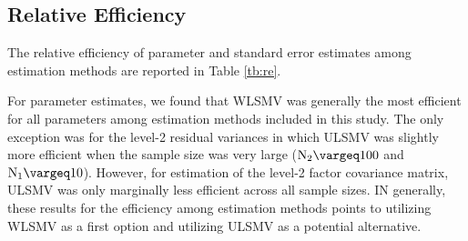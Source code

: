 \documentclass[man, noextraspace, 12pt]{apa7}
\renewcommand{\geq}{\vargeq}
\begin{document}
\subsection{Relative Efficiency}


The relative efficiency of parameter and standard error estimates among estimation methods are reported in Table \ref{tb:re}. 

For parameter estimates, we found that WLSMV was generally the most efficient for all parameters among estimation methods included in this study.
The only exception was for the level-2 residual variances in which ULSMV was slightly more efficient when the sample size was very large ($\rm N_2 \geq 100$ and $\rm N_1 \geq 10$).
However, for estimation of the level-2 factor covariance matrix, ULSMV was only marginally less efficient across all sample sizes.
IN generally, these results for the efficiency among estimation methods points to utilizing WLSMV as a first option and utilizing ULSMV as a potential alternative.
\end{document}
